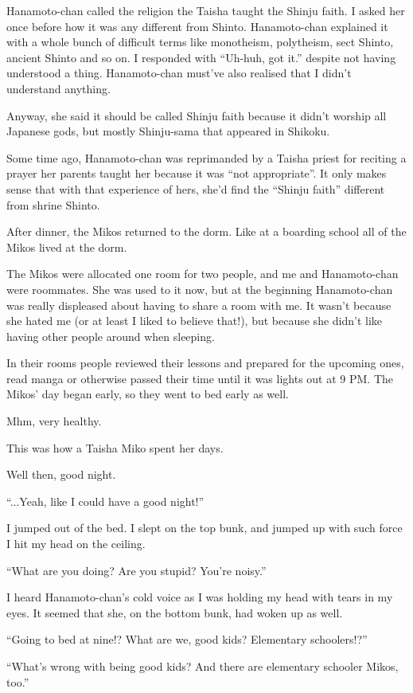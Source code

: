 Hanamoto-chan called the religion the Taisha taught the Shinju faith. I asked her once before how it was any different from Shinto. Hanamoto-chan explained it with a whole bunch of difficult terms like monotheism, polytheism, sect Shinto, ancient Shinto and so on. I responded with ``Uh-huh, got it.'' despite not having understood a thing. Hanamoto-chan must've also realised that I didn't understand anything.

Anyway, she said it should be called Shinju faith because it didn't worship all Japanese gods, but mostly Shinju-sama that appeared in Shikoku.

Some time ago, Hanamoto-chan was reprimanded by a Taisha priest for reciting a prayer her parents taught her because it was ``not appropriate''. It only makes sense that with that experience of hers, she'd find the ``Shinju faith'' different from shrine Shinto.

After dinner, the Mikos returned to the dorm. Like at a boarding school all of the Mikos lived at the dorm.

The Mikos were allocated one room for two people, and me and Hanamoto-chan were roommates. She was used to it now, but at the beginning Hanamoto-chan was really displeased about having to share a room with me. It wasn't because she hated me (or at least I liked to believe that!), but because she didn't like having other people around when sleeping.

In their rooms people reviewed their lessons and prepared for the upcoming ones, read manga or otherwise passed their time until it was lights out at 9 PM. The Mikos' day began early, so they went to bed early as well.

Mhm, very healthy.

This was how a Taisha Miko spent her days.

Well then, good night.

``...Yeah, like I could have a good night!''

I jumped out of the bed. I slept on the top bunk, and jumped up with such force I hit my head on the ceiling.

``What are you doing? Are you stupid? You're noisy.''

I heard Hanamoto-chan's cold voice as I was holding my head with tears in my eyes. It seemed that she, on the bottom bunk, had woken up as well.

``Going to bed at nine!? What are we, good kids? Elementary schoolers!?''

``What's wrong with being good kids? And there are elementary schooler Mikos, too.''

